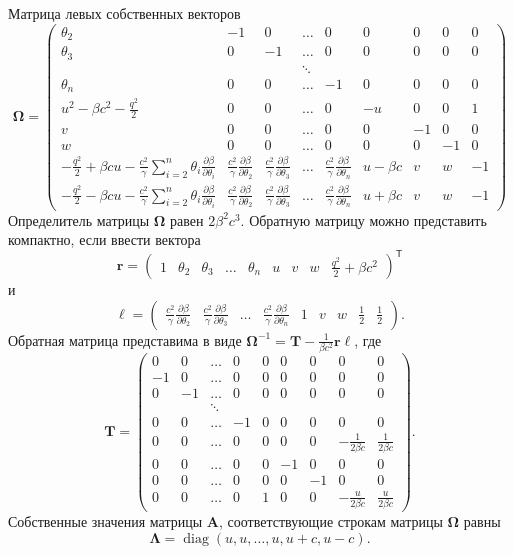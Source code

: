 \documentclass[12pt]{article}
\newcommand{\pd}[2]{\frac{\partial #1}{\partial #2}}
\newcommand{\bvec}[1]{\boldsymbol{\mathbf{#1}}}
\newcommand{\tr}{\mathsf{T}}
\begin{document}
Матрица левых собственных векторов
\[
\bvec \Omega =
\begin{pmatrix}
\theta_2 & -1 & 0 & \dots & 0 & 0 & 0 & 0 & 0\\
\theta_3 & 0 & -1 & \dots & 0 & 0 & 0 & 0 & 0\\
&&&\ddots\\
\theta_n & 0 & 0 & \dots & -1 & 0 & 0 & 0 & 0\\
u^2 - \beta c^2 - \frac{q^2}{2} &
0 & 0 & \dots & 0 & -u & 0 & 0 & 1\\
v & 0 & 0 & \dots & 0 & 0 & -1 & 0 & 0\\
w & 0 & 0 & \dots & 0 & 0 & 0 & -1 & 0\\
- \frac{q^2}{2} + \beta c u - \frac{c^2}{\gamma} 
\sum_{i=2}^n \theta_i \pd{\beta}{\theta_i}
&
\frac{c^2}{\gamma}\pd{\beta}{\theta_2}&
\frac{c^2}{\gamma}\pd{\beta}{\theta_3}&
\dots&
\frac{c^2}{\gamma}\pd{\beta}{\theta_n}&
u - \beta c & v & w & -1\\
- \frac{q^2}{2} - \beta c u - \frac{c^2}{\gamma} 
\sum_{i=2}^n \theta_i \pd{\beta}{\theta_i}
&
\frac{c^2}{\gamma}\pd{\beta}{\theta_2}&
\frac{c^2}{\gamma}\pd{\beta}{\theta_3}&
\dots&
\frac{c^2}{\gamma}\pd{\beta}{\theta_n}&
u + \beta c & v & w & -1
\end{pmatrix}
\]
Определитель матрицы $\bvec \Omega$ равен $2\beta^2 c^3$.
Обратную матрицу можно представить компактно, если ввести вектора
\[
\bvec r = \begin{pmatrix}
1 & \theta_2 & \theta_3 & \dots & \theta_n &
u & v & w & \frac{q^2}{2} + \beta c^2
\end{pmatrix}^\tr
\]
и
\[
\bvec \ell = \begin{pmatrix}
\frac{c^2}{\gamma}\pd{\beta}{\theta_2}&
\frac{c^2}{\gamma}\pd{\beta}{\theta_3}&
\dots&
\frac{c^2}{\gamma}\pd{\beta}{\theta_n}&
1 & v & w & \frac{1}{2} & \frac{1}{2}
\end{pmatrix}.
\]
Обратная матрица представима в виде $\bvec \Omega^{-1} = \bvec T - \frac{1}{\beta c^2} \bvec r 
\bvec \ell$, где
\[
\bvec T = \begin{pmatrix}
 0 & 0 & \dots & 0 & 0 & 0 & 0 & 0 & 0\\
-1 & 0 & \dots & 0 & 0 & 0 & 0 & 0 & 0\\
0 & -1 & \dots & 0 & 0 & 0 & 0 & 0 & 0\\
&& \ddots\\
0&0&\dots&-1& 0 & 0 & 0 & 0 & 0\\
0&0&\dots& 0& 0 & 0 & 0 & -\frac{1}{2\beta c} & \frac{1}{2\beta c}\\
0&0&\dots& 0& 0 & -1 & 0 & 0 & 0\\
0&0&\dots& 0& 0 & 0 & -1 & 0 & 0\\
0&0&\dots& 0& 1 & 0 & 0 & -\frac{u}{2\beta c} & \frac{u}{2\beta c}
\end{pmatrix}.
\]
Собственные значения матрицы $\bvec A$, соответствующие строкам матрицы $\bvec \Omega$ равны
\[
\bvec \Lambda = \operatorname{diag}(u, u, \dots, u, u + c, u - c).
\]
\end{document}
